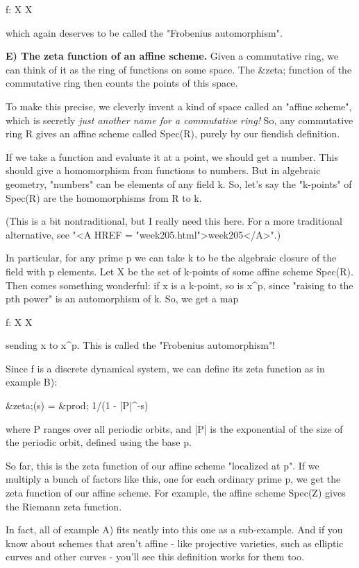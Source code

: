 f: X \to  X

which again deserves to be called the "Frobenius automorphism".

\textbf{E) The zeta function of an affine scheme.}  Given a commutative ring, 
we can think of it as the ring of functions on some space.  The &zeta; 
function of the commutative ring then counts the points of this space.

To make this precise, we cleverly invent a kind of space called an 
"affine scheme", which is secretly 
\emph{just another name for a commutative ring!}
So, any commutative ring R gives an affine scheme called Spec(R), 
purely by our fiendish definition.

If we take a function and evaluate it at a point, we should get a number.
This should give a homomorphism from functions to numbers.  But in
algebraic geometry, "numbers" can be elements of any field k.  So, let's 
say the "k-points" of Spec(R) are the homomorphisms from R to k.  

(This is a bit nontraditional, but I really need this here.
For a more traditional alternative, see "<A HREF = "week205.html">week205</A>".)

In particular, for any prime p we can take k to be the algebraic
closure of the field with p elements.  Let X be the set of k-points 
of some affine scheme Spec(R).   Then comes something wonderful: 
if x is a k-point, so is x^{p}, 
since "raising to the pth power" is an 
automorphism of k.  So, we get a map

f: X \to  X

sending x to x^{p}.  
This is called the "Frobenius automorphism"!

Since f is a discrete dynamical system, we can define its zeta function
as in example B):

&zeta;(s) = &prod; 1/(1 - |P|^{-s})

where P ranges over all periodic orbits, and |P| is the exponential
of the size of the periodic orbit, defined using the base p.

So far, this 
is the zeta function of our affine scheme "localized at p".
If we multiply a bunch of factors like this, one for each ordinary
prime p, we get the zeta function of our affine scheme.
For example, the affine scheme Spec(Z) gives the Riemann zeta function.

In fact, all of example A) fits neatly into this one as a sub-example.
And if you know about schemes that aren't affine - like projective
varieties, such as elliptic curves and other curves - you'll see 
this definition works for them too.

